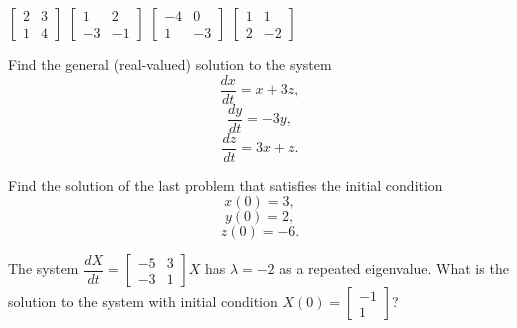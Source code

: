 \documentclass[11pt]{exam}
\begin{document}
\begin{questions}
\begin{oneparchoices}
\choice $\begin{bmatrix} 2 & 3 \\ 1 & 4 \end{bmatrix}$ \hspace{0.5in}
\choice $\begin{bmatrix} 1 & 2 \\ -3 & -1 \end{bmatrix}$ \hspace{0.5in}
\choice $\begin{bmatrix} -4 & 0 \\ 1 & -3 \end{bmatrix}$ \hspace{0.5in}
\choice $\begin{bmatrix} 1 & 1 \\ 2 & -2 \end{bmatrix}$ 
\end{oneparchoices}
\vfill


\question Find the general (real-valued) solution to the system 
$$\dfrac{dx}{dt} = x + 3z,$$
$$\dfrac{dy}{dt} = -3y,$$
$$\dfrac{dz}{dt} = 3x + z.$$
\vfill
\vfill

\question Find the solution of the last problem that satisfies the initial condition
$$x(0) = 3,$$
$$y(0) = 2,$$
$$z(0) = -6.$$
\vfill
\vfill

\question The system $\dfrac{dX}{dt} = \begin{bmatrix} -5 & 3 \\ -3 & 1 \end{bmatrix} X$ has $\lambda = -2$ as a repeated eigenvalue.  What is the solution to the system with initial condition $X(0) = \begin{bmatrix} -1 \\ 1 \end{bmatrix}$?
\vfill
\vfill


\end{questions}
\end{document}
